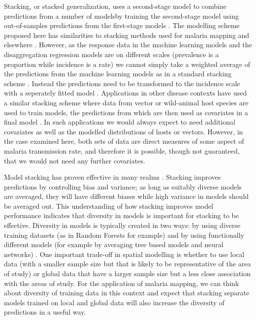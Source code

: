\documentclass[review]{elsarticle}
\begin{document}
Stacking, or stacked generalization, uses a second-stage model to combine predictions from a number of modelsby training the second-stage model using out-of-samples predictions from the first-stage models  \citep{wolpert1992stacked} .
The modelling scheme proposed here has similarities to stacking methods used for malaria mapping \citep{bhatt2017improved} and elsewhere \citep{wolpert1992stacked, sill2009feature, hao2019review, breiman1996stacked}.
However, as the response data in the machine learning models and the disaggregation regression models are on different scales (prevalence is a proportion while incidence is a rate) we cannot simply take a weighted average of the predictions from the machine learning models as in a standard stacking scheme \citep{sill2009feature, hao2019review}.
Instead the predictions need to be transformed to the incidence scale with a seperately fitted model \citep{cameron2015defining}.
Applications in other disease contexts have used a similar stacking scheme where data from vector or wild-animal host species are used to train models, the predictions from which are then used as covariates in a final model \citep{pigott2014mapping, shearer2016estimating}.
In such applications we would always expect to need additional covariates as well as the modelled distributions of hosts or vectors.
However, in the case examined here, both sets of data are direct measures of some aspect of malaria transmission rate, and therefore it is possible, though not guaranteed, that we would not need any further covariates. 


Model stacking \citep{wolpert1992stacked} has proven effective in many realms \citep{bhatt2017improved, sill2009feature, hao2019review, breiman1996stacked}. 
Stacking improves predictions by controlling bias and variance; as long as suitably diverse models are averaged, they will have different biases while high variance in models should be averaged out.
This understanding of how stacking improves model performance indicates that diversity in models is important for stacking to be effective.
Diversity in models is typically created in two ways: by using diverse training datasets \citep{breiman1996bagging} (as in Random Forests for example) and by using functionally different models (for example by averaging tree based models and neural networks) \citep{breiman1996stacked}.
One important trade-off in spatial modelling is whether to use local data (with a smaller sample size but that is likely to be representative of the area of study) or global data that have a larger sample size but a less close association with the areas of study.
For the application of malaria mapping, we can think about diversity of training data in this context and expect that stacking separate models trained on local and global data will also increase the diversity of predictions in a useful way.
\end{document}
